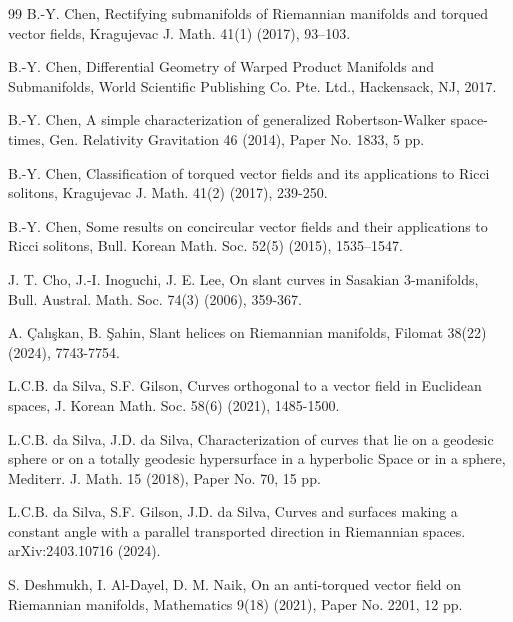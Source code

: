\documentclass[12pt]{amsart}
\theoremstyle{definition}
\begin{document}
\begin{thebibliography}{99}
 B.-Y. Chen, Rectifying submanifolds of Riemannian manifolds and torqued vector fields, Kragujevac J. Math. 41(1) (2017), 93--103.


 B.-Y. Chen, Differential Geometry of Warped Product Manifolds and Submanifolds, World Scientific Publishing Co. Pte. Ltd., Hackensack, NJ, 2017.

 B.-Y. Chen, A simple characterization of generalized Robertson-Walker space-times, Gen. Relativity Gravitation 46 (2014), Paper No. 1833, 5 pp.


 B.-Y. Chen, Classification of torqued vector fields and its applications to Ricci solitons, Kragujevac J. Math. 41(2) (2017), 239-250.

 B.-Y. Chen, Some results on concircular vector fields and their applications to Ricci solitons, Bull. Korean Math. Soc. 52(5) (2015), 1535–1547.

 J. T. Cho, J.-I. Inoguchi, J. E. Lee, On slant curves in Sasakian 3-manifolds, Bull. Austral. Math. Soc. 74(3) (2006), 359-367.


 A. Çalışkan, B. Şahin, Slant helices on Riemannian manifolds, Filomat 38(22) (2024), 7743-7754.

 L.C.B. da Silva, S.F. Gilson, Curves orthogonal to a vector field in Euclidean spaces, J. Korean Math. Soc. 58(6) (2021), 1485-1500.

 L.C.B. da Silva, J.D. da Silva, Characterization of curves that lie on a geodesic sphere or on a totally geodesic hypersurface in a hyperbolic Space or in a sphere, Mediterr. J. Math. 15 (2018), Paper No. 70, 15 pp.

 L.C.B. da Silva, S.F. Gilson, J.D. da Silva, Curves and surfaces making a constant angle with a parallel transported direction in Riemannian spaces. arXiv:2403.10716 (2024).

 S. Deshmukh, I. Al-Dayel, D. M. Naik, On an anti-torqued vector field on Riemannian manifolds, Mathematics 9(18) (2021), Paper No. 2201, 12 pp.


\end{thebibliography}
\end{document}
